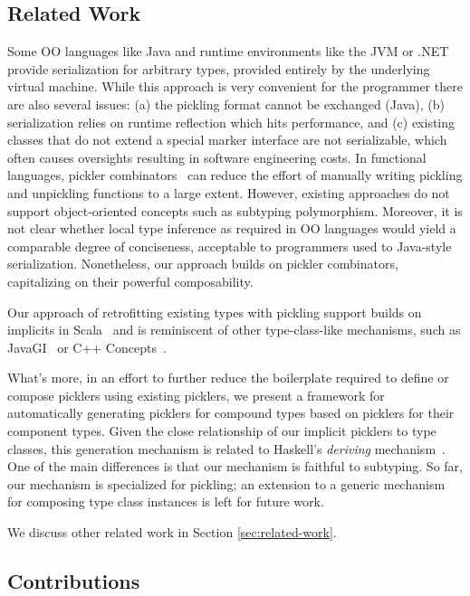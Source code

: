 \documentclass[preprint,10pt]{sigplanconf}
\theoremstyle{definition}
\theoremstyle{definition}
\begin{document}
\subsection{Related Work}

Some OO languages like Java and runtime environments like the JVM or
.NET provide serialization for arbitrary types, provided entirely by
the underlying virtual machine. While this approach is very convenient
for the programmer there are also several issues: (a) the pickling
format cannot be exchanged (Java), (b) serialization relies on runtime
reflection which hits performance, and (c) existing classes that do
not extend a special marker interface are not serializable, which
often causes oversights resulting in software engineering costs. In
functional languages, pickler
combinators~\cite{Kennedy2004,Elsman2005} can reduce the effort of
manually writing pickling and unpickling functions to a large
extent. However, existing approaches do not support object-oriented
concepts such as subtyping polymorphism. Moreover, it is not clear
whether local type inference as required in OO languages would yield a
comparable degree of conciseness, acceptable to programmers used to
Java-style serialization.  Nonetheless, our approach builds on pickler
combinators, capitalizing on their powerful composability.

Our approach of retrofitting existing types with pickling support
builds on implicits in Scala~\cite{Oliveira2010} and is reminiscent of
other type-class-like mechanisms, such as JavaGI~\cite{WehrT11} or C++
Concepts~\cite{ReisS06}.

What's more, in an effort to further reduce the boilerplate required
to define or compose picklers using existing picklers, we present a
framework for automatically generating picklers for compound types
based on picklers for their component types. Given the close
relationship of our implicit picklers to type classes, this generation
mechanism is related to Haskell's {\em deriving}
mechanism~\cite{MagalhaesDJL10}. One of the main differences is that
our mechanism is faithful to subtyping. So far, our mechanism is
specialized for pickling; an extension to a generic mechanism for
composing type class instances is left for future work.

We discuss other related work in Section \ref{sec:related-work}.

\subsection{Contributions}
\end{document}
